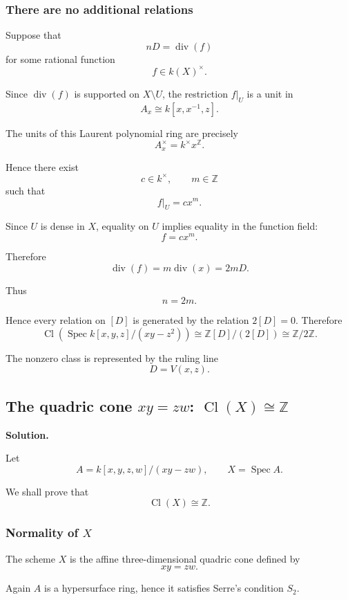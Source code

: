 \subsubsection{There are no additional relations}

Suppose that
\[
nD=\operatorname{div}(f)
\]
for some rational function
\[
f\in k(X)^\times.
\]

Since \(\operatorname{div}(f)\) is supported on \(X\setminus U\), the restriction \(f|_U\) is a unit in
\[
A_x\cong k[x,x^{-1},z].
\]

The units of this Laurent polynomial ring are precisely
\[
A_x^\times=k^\times x^{\mathbb{Z}}.
\]

Hence there exist
\[
c\in k^\times,
\qquad
m\in \mathbb{Z}
\]
such that
\[
f|_U=cx^m.
\]

Since \(U\) is dense in \(X\), equality on \(U\) implies equality in the function field:
\[
f=cx^m.
\]

Therefore
\[
\operatorname{div}(f)
=
m\operatorname{div}(x)
=
2mD.
\]

Thus
\[
n=2m.
\]

Hence every relation on \([D]\) is generated by the relation \(2[D]=0\). Therefore
\[
\boxed{
	\operatorname{Cl}\!\left(\operatorname{Spec} k[x,y,z]/(xy-z^2)\right)
	\cong
	\mathbb{Z}[D]/(2[D])
	\cong
	\mathbb{Z}/2\mathbb{Z}.
}
\]

The nonzero class is represented by the ruling line
\[
D=V(x,z).
\]

\subsection{\texorpdfstring{The quadric cone \(xy=zw\): \(\operatorname{Cl}(X)\cong \mathbb{Z}\)}{The quadric cone xy=zw}}

\textbf{Solution.}

Let
\[
A=k[x,y,z,w]/(xy-zw),
\qquad
X=\operatorname{Spec} A.
\]

We shall prove that
\[
\operatorname{Cl}(X)\cong \mathbb{Z}.
\]

\subsubsection{Normality of \(X\)}

The scheme \(X\) is the affine three-dimensional quadric cone defined by
\[
xy=zw.
\]

Again \(A\) is a hypersurface ring, hence it satisfies Serre's condition \(S_2\).

